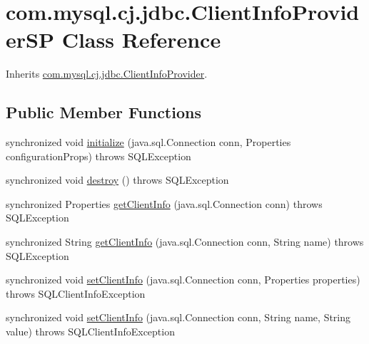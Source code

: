 \hypertarget{classcom_1_1mysql_1_1cj_1_1jdbc_1_1_client_info_provider_s_p}{}\section{com.\+mysql.\+cj.\+jdbc.\+Client\+Info\+Provider\+SP Class Reference}
\label{classcom_1_1mysql_1_1cj_1_1jdbc_1_1_client_info_provider_s_p}


Inherits \mbox{\hyperlink{interfacecom_1_1mysql_1_1cj_1_1jdbc_1_1_client_info_provider}{com.\+mysql.\+cj.\+jdbc.\+Client\+Info\+Provider}}.

\subsection*{Public Member Functions}
\begin{DoxyCompactItemize}
\item 
synchronized void \mbox{\hyperlink{classcom_1_1mysql_1_1cj_1_1jdbc_1_1_client_info_provider_s_p_a39331800ea481417eab7170b3a878af5}{initialize}} (java.\+sql.\+Connection conn, Properties configuration\+Props)  throws S\+Q\+L\+Exception 
\item 
synchronized void \mbox{\hyperlink{classcom_1_1mysql_1_1cj_1_1jdbc_1_1_client_info_provider_s_p_af68fc4a5dc0ca1325f17b78a19a5a3ff}{destroy}} ()  throws S\+Q\+L\+Exception 
\item 
synchronized Properties \mbox{\hyperlink{classcom_1_1mysql_1_1cj_1_1jdbc_1_1_client_info_provider_s_p_a27dcf12911f0de535b6653135bf10e9e}{get\+Client\+Info}} (java.\+sql.\+Connection conn)  throws S\+Q\+L\+Exception 
\item 
synchronized String \mbox{\hyperlink{classcom_1_1mysql_1_1cj_1_1jdbc_1_1_client_info_provider_s_p_a64004310beae80de1724f7523a5d6337}{get\+Client\+Info}} (java.\+sql.\+Connection conn, String name)  throws S\+Q\+L\+Exception 
\item 
synchronized void \mbox{\hyperlink{classcom_1_1mysql_1_1cj_1_1jdbc_1_1_client_info_provider_s_p_a19b01b8ef9dd49bf29b66c079822d2eb}{set\+Client\+Info}} (java.\+sql.\+Connection conn, Properties properties)  throws S\+Q\+L\+Client\+Info\+Exception 
\item 
synchronized void \mbox{\hyperlink{classcom_1_1mysql_1_1cj_1_1jdbc_1_1_client_info_provider_s_p_a5f11c59093e5f448770a7f48fb17fcf2}{set\+Client\+Info}} (java.\+sql.\+Connection conn, String name, String value)  throws S\+Q\+L\+Client\+Info\+Exception 
\end{DoxyCompactItemize}


